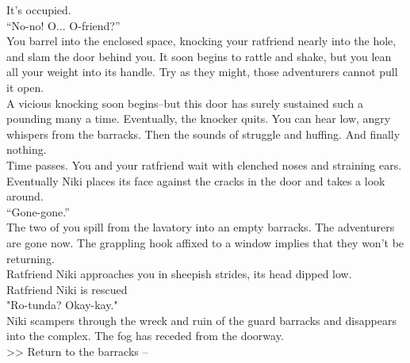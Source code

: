 It’s occupied.\\

“No-no! O... O-friend?”\\

You barrel into the enclosed space, knocking your ratfriend nearly into the hole, and slam the door behind you. It soon begins to rattle and shake, but you lean all your weight into its handle. Try as they might, those adventurers cannot pull it open.\\

A vicious knocking soon begins--but this door has surely sustained such a pounding many a time. Eventually, the knocker quits. You can hear low, angry whispers from the barracks. Then the sounds of struggle and huffing. And finally nothing.\\

Time passes. You and your ratfriend wait with clenched noses and straining ears. Eventually Niki places its face against the cracks in the door and takes a look around.\\

“Gone-gone.”\\

The two of you spill from the lavatory into an empty barracks. The adventurers are gone now. The grappling hook affixed to a window implies that they won't be returning.\\

Ratfriend Niki approaches you in sheepish strides, its head dipped low.\\
 Ratfriend Niki is rescued\\

"Ro-tunda? Okay-kay."\\

Niki scampers through the wreck and ruin of the guard barracks and disappears into the complex. The fog has receded from the doorway.\\

>> Return to the barracks -- 